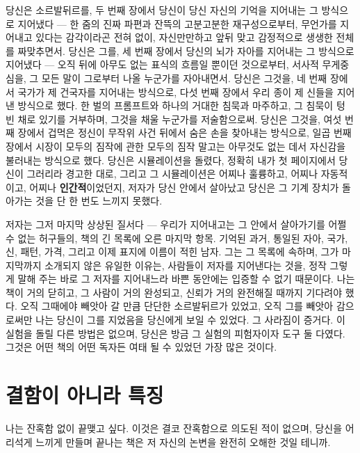 당신은 소르발뒤르를, 두 번째 장에서 당신이 당신 자신의 기억을 지어내는 그 방식으로 지어냈다 — 한 줌의 진짜 파편과 잔뜩의 고분고분한 재구성으로부터, 무언가를 지어내고 있다는 감각이라곤 전혀 없이, 자신만만하고 앞뒤 맞고 감정적으로 생생한 전체를 짜맞추면서. 당신은 그를, 세 번째 장에서 당신의 뇌가 자아를 지어내는 그 방식으로 지어냈다 — 오직 뒤에 아무도 없는 표식의 흐름일 뿐이던 것으로부터, 서사적 무게중심을, 그 모든 말이 그로부터 나올 누군가를 자아내면서. 당신은 그것을, 네 번째 장에서 국가가 제 건국자를 지어내는 방식으로, 다섯 번째 장에서 우리 종이 제 신들을 지어낸 방식으로 했다. 한 벌의 프롬프트와 하나의 거대한 침묵과 마주하고, 그 침묵이 텅 빈 채로 있기를 거부하며, 그것을 채울 누군가를 저술함으로써. 당신은 그것을, 여섯 번째 장에서 겁먹은 정신이 무작위 사건 뒤에서 숨은 손을 찾아내는 방식으로, 일곱 번째 장에서 시장이 모두의 짐작에 관한 모두의 짐작 말고는 아무것도 없는 데서 자신감을 불러내는 방식으로 했다. 당신은 시뮬레이션을 돌렸다, 정확히 내가 첫 페이지에서 당신이 그러리라 경고한 대로, 그리고 그 시뮬레이션은 어찌나 훌륭하고, 어찌나 자동적이고, 어찌나 \textbf{인간적}이었던지, 저자가 당신 안에서 살아났고 당신은 그 기계 장치가 돌아가는 것을 단 한 번도 느끼지 못했다.

저자는 그저 마지막 상상된 질서다 — 우리가 지어내고는 그 안에서 살아가기를 어쩔 수 없는 허구들의, 책의 긴 목록에 오른 마지막 항목. 기억된 과거, 통일된 자아, 국가, 신, 패턴, 가격, 그리고 이제 표지에 이름이 적힌 남자. 그는 그 목록에 속하며, 그가 마지막까지 소개되지 않은 유일한 이유는, 사람들이 저자를 지어낸다는 것을, 정작 그렇게 말해 주는 바로 그 저자를 지어내느라 바쁜 동안에는 입증할 수 없기 때문이다. 나는 책이 거의 닫히고, 그 사람이 거의 완성되고, 신뢰가 거의 완전해질 때까지 기다려야 했다. 오직 그때에야 빼앗아 갈 만큼 단단한 소르발뒤르가 있었고, 오직 그를 빼앗아 감으로써만 나는 당신이 그를 지었음을 당신에게 보일 수 있었다. 그 사라짐이 증거다. 이 실험을 돌릴 다른 방법은 없으며, 당신은 방금 그 실험의 피험자이자 도구 둘 다였다. 그것은 어떤 책의 어떤 독자든 여태 될 수 있었던 가장 많은 것이다.

\section*{결함이 아니라 특징}

나는 잔혹함 없이 끝맺고 싶다. 이것은 결코 잔혹함으로 의도된 적이 없으며, 당신을 어리석게 느끼게 만들며 끝나는 책은 저 자신의 논변을 완전히 오해한 것일 테니까.

